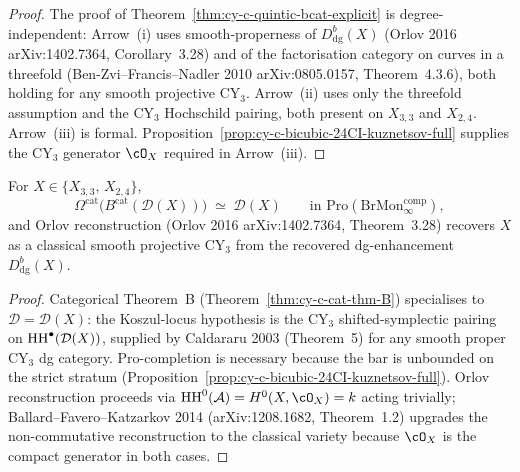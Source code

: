 \begin{proof}
The proof of Theorem~\ref{thm:cy-c-quintic-bcat-explicit} is
degree-independent: Arrow~(i) uses smooth-properness of
$D^b_{\mathrm{dg}}(X)$ (Orlov 2016 arXiv:1402.7364, Corollary~3.28)
and of the factorisation category on curves in a threefold
(Ben-Zvi--Francis--Nadler 2010 arXiv:0805.0157, Theorem~4.3.6), both
holding for any smooth projective CY$_3$. Arrow~(ii) uses only the
threefold assumption and the CY$_3$ Hochschild pairing, both present
on $X_{3,3}$ and $X_{2,4}$. Arrow~(iii) is formal.
Proposition~\ref{prop:cy-c-bicubic-24CI-kuznetsov-full} supplies the
CY$_3$ generator $\cO_X$ required in Arrow~(iii).
\end{proof}

\begin{theorem}
\label{thm:cy-c-bicubic-24CI-omega-cat-recovery}
For $X \in \{X_{3,3},\, X_{2,4}\}$,
\[
 \Omega^{\mathrm{cat}}\!\bigl( B^{\mathrm{cat}}(\mathcal D(X)) \bigr)
 \;\simeq\; \mathcal D(X)
 \qquad \text{in } \mathrm{Pro}(\mathrm{BrMon}^{\mathrm{comp}}_\infty),
\]
and Orlov reconstruction (Orlov 2016 arXiv:1402.7364, Theorem~3.28)
recovers $X$ as a classical smooth projective CY$_3$ from the recovered
dg-enhancement $D^b_{\mathrm{dg}}(X)$.
\end{theorem}

\begin{proof}
Categorical Theorem~B
(Theorem~\ref{thm:cy-c-cat-thm-B}) specialises to
$\mathcal D = \mathcal D(X)$: the Koszul-locus hypothesis is the
CY$_3$ shifted-symplectic pairing on $\mathrm{HH}^\bullet(\mathcal D(X))$,
supplied by Caldararu 2003 (Theorem~5) for any smooth proper CY$_3$
dg category. Pro-completion is necessary because the bar is unbounded
on the strict stratum
(Proposition~\ref{prop:cy-c-bicubic-24CI-kuznetsov-full}). Orlov
reconstruction proceeds via $\HH^0(\mathcal A) = H^0(X, \cO_X) = k$
acting trivially; Ballard--Favero--Katzarkov 2014
(arXiv:1208.1682, Theorem~1.2) upgrades the non-commutative
reconstruction to the classical variety because $\cO_X$ is the
compact generator in both cases.
\end{proof}

